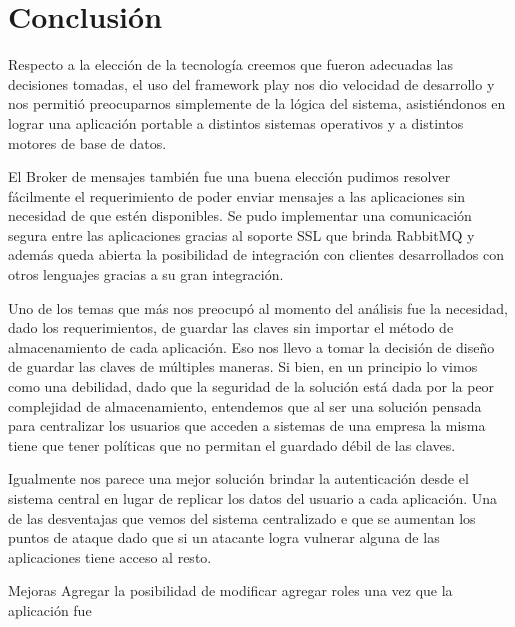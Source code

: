 \section{Conclusión}

Respecto a la elección de la tecnología creemos que fueron adecuadas las decisiones tomadas, el uso del framework play nos dio velocidad de desarrollo y nos permitió preocuparnos simplemente de la lógica del sistema, asistiéndonos en lograr una aplicación portable a distintos sistemas operativos y a distintos motores de base de datos.

El Broker de mensajes también fue una buena elección pudimos resolver fácilmente el requerimiento de poder enviar mensajes a las aplicaciones sin necesidad de que estén disponibles. Se pudo implementar una comunicación segura entre las aplicaciones gracias al soporte SSL que brinda RabbitMQ y además queda abierta la posibilidad de integración con clientes desarrollados con otros lenguajes gracias a su gran integración.

Uno de los temas que más nos preocupó al momento del análisis fue la necesidad, dado los requerimientos, de guardar las claves sin importar el método de almacenamiento de cada aplicación. Eso nos llevo a tomar la decisión de diseño de guardar las claves de múltiples maneras. Si bien, en un principio lo vimos como una debilidad, dado que la seguridad de la solución está dada por la peor complejidad de almacenamiento, entendemos que al ser una solución pensada para centralizar los usuarios que acceden a sistemas de una empresa la misma tiene que tener políticas que no permitan el guardado débil de las claves. 

Igualmente nos parece una mejor solución brindar la autenticación desde el sistema central en lugar de replicar los datos del usuario a cada aplicación. Una de las desventajas que vemos del sistema centralizado e que se aumentan los puntos de ataque dado que si un atacante logra vulnerar alguna de las aplicaciones tiene acceso al resto. 




Mejoras
Agregar la posibilidad de modificar agregar roles una vez que la aplicación fue 




